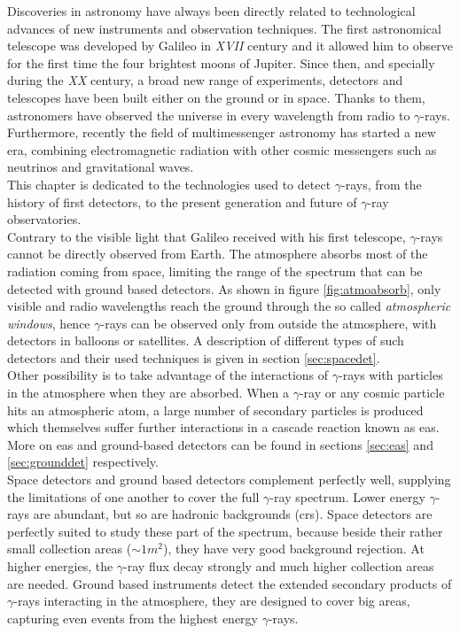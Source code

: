 \documentclass[main.tex]{subfiles}
\begin{document}
Discoveries in astronomy have always been directly related to technological advances of new instruments and observation techniques. The first astronomical telescope was developed by Galileo in \textit{XVII} century and it allowed him to observe for the first time the four brightest moons of Jupiter. Since then, and specially during the \textit{XX} century, a broad new range of experiments, detectors and telescopes have been built either on the ground or in space. Thanks to them, astronomers have observed the universe in every wavelength from radio to $\gamma$-rays. Furthermore, recently the field of multimessenger astronomy has started a new era, combining electromagnetic radiation with other cosmic messengers such as neutrinos and gravitational waves.\\

This chapter is dedicated to the technologies used to detect $\gamma$-rays, from the history of first detectors, to the present generation and future of $\gamma$-ray observatories.\\
Contrary to the visible light that Galileo received with his first telescope, $\gamma$-rays cannot be directly observed from Earth. The atmosphere absorbs most of the radiation coming from space, limiting the range of the spectrum that can be detected with ground based detectors. As shown in figure \ref{fig:atmoabsorb}, only visible and radio wavelengths reach the ground through the so called \textit{atmospheric windows}, hence $\gamma$-rays can be observed only from outside the atmosphere, with detectors in balloons or satellites. A description of different types of such detectors and their used techniques is given in section \ref{sec:spacedet}.\\

Other possibility is to take advantage of the interactions of $\gamma$-rays with particles in the atmosphere when they are absorbed. When a $\gamma$-ray or any cosmic particle hits an atmospheric atom, a large number of secondary particles is produced which themselves suffer further interactions in a cascade reaction known as \gls{eas}.
More on \gls{eas} and ground-based detectors can be found in sections \ref{sec:eas} and \ref{sec:grounddet} respectively.\\

Space detectors and ground based detectors complement perfectly well, supplying the limitations of one another to cover the full $\gamma$-ray spectrum. Lower energy $\gamma$-rays are abundant, but so are hadronic backgrounds (\glspl{cr}). Space detectors are perfectly suited to study these part of the spectrum, because beside their rather small collection areas ($\sim 1 m^2$), they have very good background rejection. At higher energies, the $\gamma$-ray flux decay strongly and much higher collection areas are needed. Ground based instruments detect the extended secondary products of $\gamma$-rays interacting in the atmosphere, they are designed to cover big areas, capturing even events from the highest energy $\gamma$-rays.\\
\end{document}
